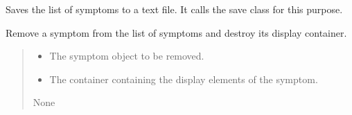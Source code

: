 \documentclass[letterpaper,10pt,english]{sphinxmanual}
\begin{document}
\begin{fulllineitems}

\begin{fulllineitems}
\label{\detokenize{general_interface:general_interface_V10.InterfaceGenerale.sauvegarde}}
\pysigstartsignatures
{}
\pysigstopsignatures
\sphinxAtStartPar
Saves the list of symptoms to a text file.
It calls the save class for this purpose.

\end{fulllineitems}


\begin{fulllineitems}
\label{\detokenize{general_interface:general_interface_V10.InterfaceGenerale.supprimer}}
\pysigstartsignatures
{}
\pysigstopsignatures
\sphinxAtStartPar
Remove a symptom from the list of symptoms and destroy its display container.
\begin{quote}\begin{description}
\begin{itemize}
\item {} 
\sphinxAtStartPar
{} \textendash{} The symptom object to be removed.

\item {} 
\sphinxAtStartPar
{} \textendash{} The container containing the display elements of the symptom.

\end{itemize}

\sphinxAtStartPar
None

\end{description}\end{quote}

\end{fulllineitems}



\end{fulllineitems}
\end{document}
